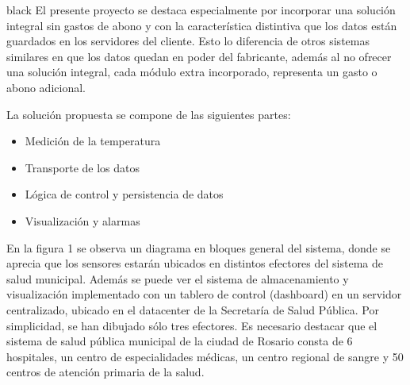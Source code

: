 \documentclass[11pt]{charter}
\begin{document}
\begin{consigna}{black}
El presente proyecto se destaca especialmente por incorporar una solución integral sin gastos de abono y con la característica distintiva que los datos están guardados en los servidores del cliente. Esto lo diferencia de otros sistemas similares en que los datos quedan en poder del fabricante, además al no ofrecer una solución integral, cada módulo extra incorporado, representa un gasto o abono adicional. 

La solución propuesta se compone de las siguientes partes:
\begin{itemize}
\item Medición de la temperatura
\item Transporte de los datos
\item Lógica de control y persistencia de datos
\item Visualización y alarmas
\end{itemize}


En la figura 1 se observa un diagrama en bloques general del sistema, donde se aprecia que los sensores estarán ubicados en distintos efectores del sistema de salud municipal. Además se puede ver el sistema de almacenamiento y visualización implementado con un tablero de control  (dashboard) en un servidor centralizado, ubicado en el datacenter de la Secretaría de Salud Pública. Por simplicidad, se han dibujado sólo tres efectores. Es necesario destacar que el sistema de salud pública municipal de la ciudad de Rosario consta de 6 hospitales, un centro de especialidades médicas, un centro regional de sangre y 50 centros de atención primaria de la salud.
\vspace{25px}


\end{consigna}
\end{document}
